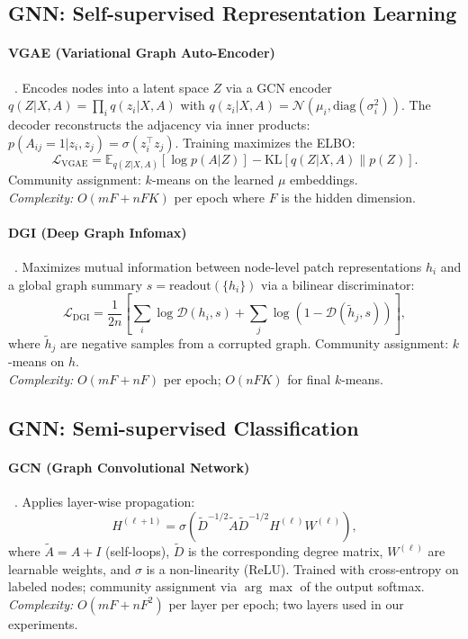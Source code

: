 \documentclass[11pt]{article}
\begin{document}
\subsection{GNN: Self-supervised Representation Learning}

\paragraph{VGAE (Variational Graph Auto-Encoder)}~\citep{thomas_kipf_6638cd97}.
Encodes nodes into a latent space $Z$ via a GCN encoder $q(Z|X,A) = \prod_i q(z_i|X,A)$ with $q(z_i|X,A) = \mathcal{N}(\mu_i, \text{diag}(\sigma_i^2))$. The decoder reconstructs the adjacency via inner products: $p(A_{ij}=1|z_i,z_j) = \sigma(z_i^\top z_j)$. Training maximizes the ELBO:
\[
\mathcal{L}_\text{VGAE} = \mathbb{E}_{q(Z|X,A)}[\log p(A|Z)] - \text{KL}[q(Z|X,A)\|p(Z)].
\]
Community assignment: $k$-means on the learned $\mu$ embeddings.\\
\emph{Complexity:} $O(mF + nFK)$ per epoch where $F$ is the hidden dimension.

\paragraph{DGI (Deep Graph Infomax)}~\citep{velickovic_dgi_2019}.
Maximizes mutual information between node-level patch representations $h_i$ and a global graph summary $s = \text{readout}(\{h_i\})$ via a bilinear discriminator:
\[
\mathcal{L}_\text{DGI} = \frac{1}{2n}\left[\sum_i \log\mathcal{D}(h_i, s) + \sum_j \log(1 - \mathcal{D}(\tilde{h}_j, s))\right],
\]
where $\tilde{h}_j$ are negative samples from a corrupted graph. Community assignment: $k$-means on $h$.\\
\emph{Complexity:} $O(mF + nF)$ per epoch; $O(nFK)$ for final $k$-means.

\subsection{GNN: Semi-supervised Classification}

\paragraph{GCN (Graph Convolutional Network)}~\citep{thomas_kipf_d7121869}.
Applies layer-wise propagation:
\[
H^{(\ell+1)} = \sigma\!\left(\tilde{D}^{-1/2}\tilde{A}\tilde{D}^{-1/2}H^{(\ell)}W^{(\ell)}\right),
\]
where $\tilde{A} = A + I$ (self-loops), $\tilde{D}$ is the corresponding degree matrix, $W^{(\ell)}$ are learnable weights, and $\sigma$ is a non-linearity (ReLU). Trained with cross-entropy on labeled nodes; community assignment via $\arg\max$ of the output softmax.\\
\emph{Complexity:} $O(mF + nF^2)$ per layer per epoch; two layers used in our experiments.
\end{document}
